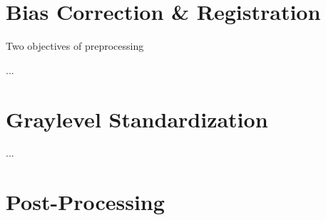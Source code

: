 \section{Bias Correction \& Registration}
Two objectives of preprocessing 
\par...\par
\section{Graylevel Standardization}
\par...\par
\clearpage
\section{Post-Processing}

\clearpage
